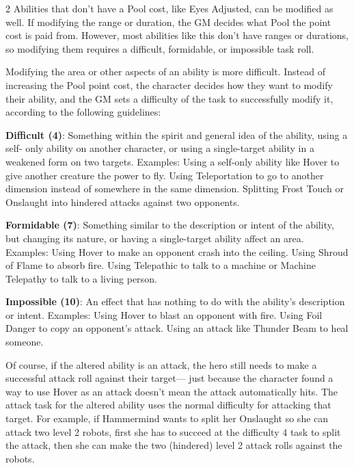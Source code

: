 \begin{multicols}{2}
Abilities that don’t have a Pool cost, like Eyes Adjusted, can be modified as well. If modifying the range or duration, the GM decides what Pool the point cost is paid from. However, most abilities like this don’t have ranges or durations, so modifying them requires a difficult, formidable, or impossible task roll.

Modifying the area or other aspects of an ability is more difficult. Instead of increasing the Pool point cost, the character decides how they want to modify their ability, and the GM sets a difficulty of the task to successfully modify it, according to the following guidelines:

\textbf{Difficult (4)}: Something within the spirit and general idea of the ability, using a self- only ability on another character, or using a single-target ability in a weakened form on two targets. Examples: Using a self-only ability like Hover to give another creature the power to fly. Using Teleportation to go to another dimension instead of somewhere in the same dimension. Splitting Frost Touch or Onslaught into hindered attacks against two opponents.

\textbf{Formidable (7)}: Something similar to the description or intent of the ability, but changing its nature, or having a single-target ability affect an area. Examples: Using Hover to make an opponent crash into the ceiling. Using Shroud of Flame to absorb fire. Using Telepathic to talk to a machine or Machine Telepathy to talk to a living person.

\textbf{Impossible (10)}: An effect that has nothing to do with the ability’s description or intent. Examples: Using Hover to blast an opponent with fire. Using Foil Danger to copy an opponent’s attack. Using an attack like Thunder Beam to heal someone.

Of course, if the altered ability is an attack, the hero still needs to make a successful attack roll against their target— just because the character found a way to use Hover as an attack doesn’t mean the attack automatically hits. The attack task for the altered ability uses the normal difficulty for attacking that target. For example, if Hammermind wants to split her Onslaught so she can attack two level 2 robots, first she has to succeed at the difficulty 4 task to split the attack, then she can make the two (hindered) level 2 attack rolls against the robots.


\end{multicols}
